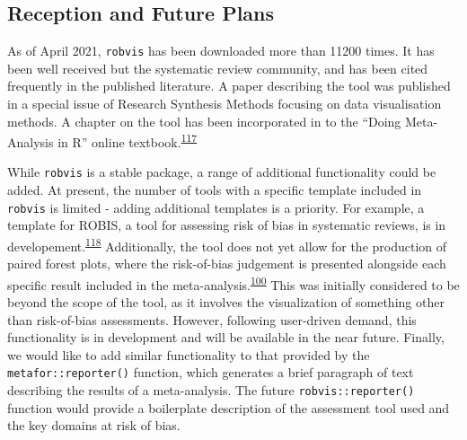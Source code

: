 \documentclass[a4paper, twoside]{templates/ociamthesis}
\newcommand*{\bibtitle}{Bibliography}
\begin{document}
\hypertarget{reception-and-future-plans-1}{%
\subsection{Reception and Future Plans}\label{reception-and-future-plans-1}}

As of April 2021, \texttt{robvis} has been downloaded more than 11200 times. It has been well received but the systematic review community, and has been cited frequently in the published literature. A paper describing the tool was published in a special issue of Research Synthesis Methods focusing on data visualisation methods. A chapter on the tool has been incorporated in to the ``Doing Meta-Analysis in R'' online textbook.\textsuperscript{\protect\hyperlink{ref-mathias_harrer_2019_2551803}{117}}

While \texttt{robvis} is a stable package, a range of additional functionality could be added. At present, the number of tools with a specific template included in \texttt{robvis} is limited - adding additional templates is a priority. For example, a template for ROBIS, a tool for assessing risk of bias in systematic reviews, is in developement.\textsuperscript{\protect\hyperlink{ref-whiting2016robis}{118}} Additionally, the tool does not yet allow for the production of paired forest plots, where the risk-of-bias judgement is presented alongside each specific result included in the meta-analysis.\textsuperscript{\protect\hyperlink{ref-cochranechpt7}{100}} This was initially considered to be beyond the scope of the tool, as it involves the visualization of something other than risk-of-bias assessments. However, following user-driven demand, this functionality is in development and will be available in the near future. Finally, we would like to add similar functionality to that provided by the \texttt{metafor::reporter()} function, which generates a brief paragraph of text describing the results of a meta-analysis. The future \texttt{robvis::reporter()} function would provide a boilerplate description of the assessment tool used and the key domains at risk of bias.


\setlength{\baselineskip}{0pt} %

{\renewcommand*\MakeUppercase[1]{#1}%
\printbibliography[heading=bibintoc,title={\bibtitle}]}
\end{document}
